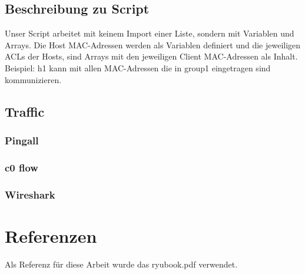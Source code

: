 \documentclass[a4,12pt]{scrartcl}
\begin{document}
\subsection{Beschreibung zu Script}
Unser Script arbeitet mit keinem Import einer Liste, sondern mit Variablen und Arrays. Die Host MAC-Adressen werden als Variablen definiert und die jeweiligen ACLs der Hosts, sind Arrays mit den jeweiligen Client MAC-Adressen als Inhalt. Beispiel: h1 kann mit allen MAC-Adressen die in group1 eingetragen sind kommunizieren. 

\subsection{Traffic}

\subsubsection{Pingall}

\subsubsection{c0 flow}

\subsubsection{Wireshark}


\section{Referenzen}
Als Referenz für diese Arbeit wurde das ryubook.pdf verwendet. 
\end{document}
